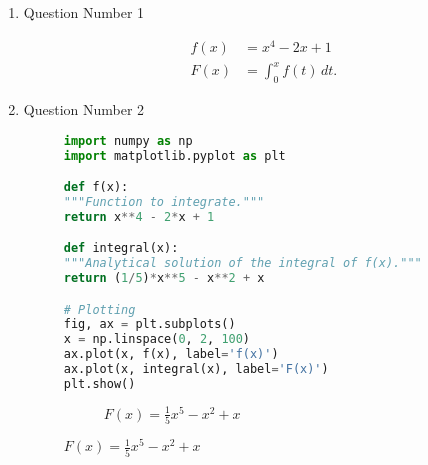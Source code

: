 \documentclass{zc-ust-hw}
\begin{document}
\maketitle

\begin{enumerate}

  \item Question Number 1

    \begin{align}
      f(x) &= x^4 - 2x + 1 \\
      F(x) &= \int_{0}^{x} f(t) \, dt 
    .\end{align}

  \item Question Number 2

    \begin{figure}[H]
      \centering
      \begin{minipage}{0.75\textwidth}
\begin{lstlisting}[language=Python]
import numpy as np
import matplotlib.pyplot as plt

def f(x):
"""Function to integrate."""
return x**4 - 2*x + 1

def integral(x):
"""Analytical solution of the integral of f(x)."""
return (1/5)*x**5 - x**2 + x

# Plotting
fig, ax = plt.subplots()
x = np.linspace(0, 2, 100)
ax.plot(x, f(x), label='f(x)')
ax.plot(x, integral(x), label='F(x)')
plt.show()
      \end{lstlisting}
    \end{minipage}
    \hfill
    \begin{subfigure}{0.2\textwidth}
      \caption{$f(x) = x^4 - 2x + 1$}
      \vspace{1em}
      \caption{$F(x) = \frac{1}{5}x^5 - x^2 + x$}
    \end{subfigure}
  \end{figure}


\end{enumerate}
\end{document}

